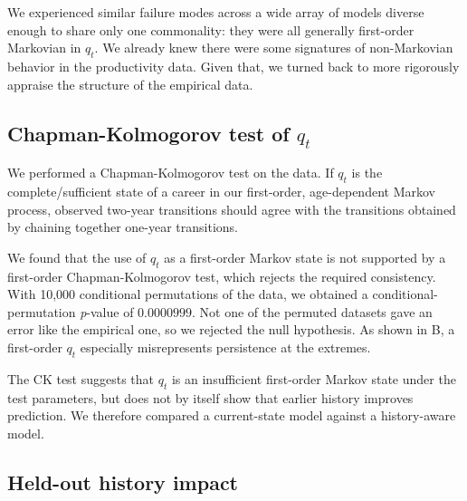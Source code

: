 \documentclass[twocolumn, letterpaper]{article}
\begin{document}
We experienced similar failure modes across a wide array of models diverse enough to share only one commonality: they were all generally first-order Markovian in $q_t$. We already knew there were some signatures of non-Markovian behavior in the productivity data. Given that, we turned back to more rigorously appraise the structure of the empirical data.

\subsection{Chapman-Kolmogorov test of \texorpdfstring{$q_t$}{q_t}}
\label{emp_motivation:ck_qt}
We performed a Chapman-Kolmogorov test on the data. If $q_t$ is the complete/sufficient state of a career in our first-order, age-dependent Markov process, observed two-year transitions should agree with the transitions obtained by chaining together one-year transitions. 

We found that the use of $q_t$ as a first-order Markov state is not supported by a first-order Chapman-Kolmogorov test, which rejects the required consistency. With 10,000 conditional permutations of the data, we obtained a conditional-permutation \textit{p}-value of $0.0000999$. Not one of the permuted datasets gave an error like the empirical one, so we rejected the null hypothesis. As shown in B, a first-order $q_t$ especially misrepresents persistence at the extremes.

The CK test suggests that $q_t$ is an insufficient first-order Markov state under the test parameters, but does not by itself show that earlier history improves prediction. We therefore compared a current-state model against a history-aware model.

\subsection{Held-out history impact}
\label{emp_motivation:held_out_history}
\end{document}
